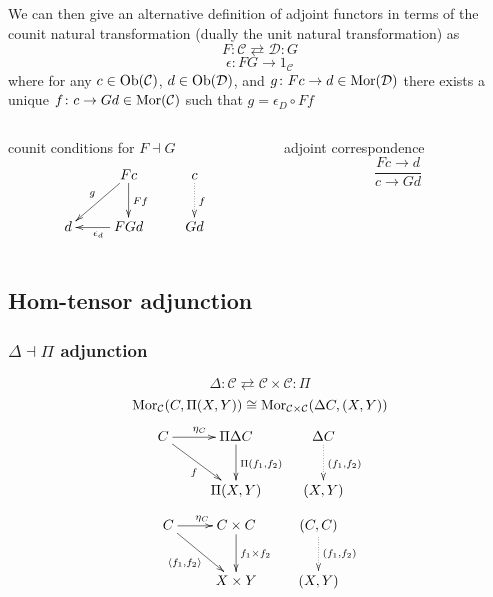 \begin{frame}
We can then give an alternative definition of adjoint functors in terms of the counit natural transformation (dually the unit natural transformation) as
$$
F \colon \mathcal{C} \rightleftarrows \mathcal{D} \colon G
$$
$$
\epsilon \colon FG \rightarrow 1_{\mathcal{C}}
$$
where for any $c \in \mathop{\rm Ob}\nolimits (\mathcal{C})$, $d \in \mathop{\rm Ob}\nolimits (\mathcal{D})$, and $g \colon Fc \rightarrow d \in \mathop{\rm Mor}\nolimits(\mathcal{D})$ there exists a unique $f \colon c \rightarrow Gd \in \mathop{\rm Mor}\nolimits(\mathcal{C})$ such that $g = \epsilon_D \circ Ff$	
\begin{columns}[t]
    \begin{column}{0.5\textwidth}
\begin{block}{counit conditions for $F \dashv G$}
$$
			\xymatrix{
			& F c \ar[d]^{F f} \ar[dl]_{g} & c \ar@{.>}[d]^{f}\\
			d & F G d \ar[l]^{\epsilon_d} & G d}
$$
\end{block}
    \end{column}
    \begin{column}{0.5\textwidth}
		     \begin{block}{adjoint correspondence}
		\abovedisplayskip=0pt
		$$
			\frac{Fc \rightarrow d}{c \rightarrow Gd}
		$$
		\end{block}
    \end{column}
\end{columns}
\end{frame}

\subsection{Hom-tensor adjunction}
\begin{frame}
\frametitle{$\Delta \dashv \Pi$ adjunction}
$$\Delta : \mathcal{C} \rightleftarrows \mathcal{C} \times \mathcal{C}: \Pi$$
$$\mathop{\rm Mor}\nolimits_{\mathcal{C}}(C, \Pi (X,Y)) \cong  \mathop{\rm Mor}\nolimits_{\mathcal{C} \times \mathcal{C}}(\Delta C, (X,Y))$$
			$$
			\xymatrix{
			C \ar[r]^{\eta_C} \ar[dr]_{f} & \Pi \Delta C \ar[d]^{\Pi (f_1, f_2)} & \Delta C \ar@{.>}[d]^{(f_1,f_2)}\\
			& \Pi (X,Y) & (X,Y)}
			$$
			$$
			\xymatrix{
			C \ar[r]^{\eta_C} \ar[dr]_{\langle f_1, f_2 \rangle} & C \times C \ar[d]^{f_1 \times f_2} & (C,C) \ar@{.>}[d]^{(f_1,f_2)}\\
			& X \times Y & (X,Y)}
			$$
\end{frame}

